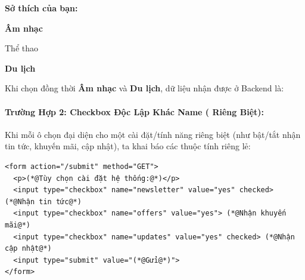 \begin{browserWindow}[Mô Phỏng Trình Duyệt: Gom Nhóm Checkbox Chung name="hobby"]
\sffamily\small
\textbf{Sở thích của bạn:} \\[6pt]
 \; \textbf{Âm nhạc} \quad
{} \; Thể thao \quad
{} \; \textbf{Du lịch} \\[8pt]
\end{browserWindow}

\begin{tipBox}
Khi chọn đồng thời \textbf{Âm nhạc} và \textbf{Du lịch}, dữ liệu nhận được ở Backend là:
\begin{center}
\end{center}
\end{tipBox}

\paragraph{Trường Hợp 2: Checkbox Độc Lập Khác Name ( Riêng Biệt):}

Khi mỗi ô chọn đại diện cho một cài đặt/tính năng riêng biệt (như bật/tắt nhận tin tức, khuyến mãi, cập nhật), ta khai báo các thuộc tính  riêng lẻ:

\begin{codeWindow}
\begin{lstlisting}[language=HTML5]
<form action="/submit" method="GET">
  <p>(*@Tùy chọn cài đặt hệ thống:@*)</p>
  <input type="checkbox" name="newsletter" value="yes" checked> (*@Nhận tin tức@*)
  <input type="checkbox" name="offers" value="yes"> (*@Nhận khuyến mãi@*)
  <input type="checkbox" name="updates" value="yes" checked> (*@Nhận cập nhật@*)
  <input type="submit" value="(*@Gửi@*)">
</form>
\end{lstlisting}
\end{codeWindow}

